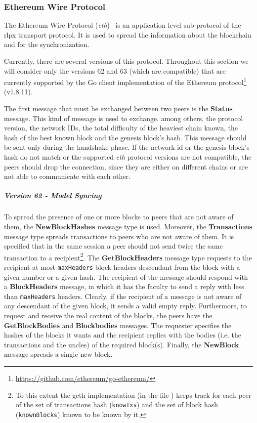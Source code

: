 \subsubsection{Ethereum Wire Protocol}
\label{sec:ethereum-wire-protocol}

The Ethereum Wire Protocol (\emph{eth})~\cite{bib:ethereumwireprotocol}  is an
application level sub-protocol of the rlpx transport protocol. It is used to 
spread the information about the blockchain and for the synchronization.

Currently, there are several versions of this protocol. Throughout 
this  section we will consider only the versions $62$ and $63$ (which are 
compatible) that are currently supported by the Go client implementation of the 
Ethereum protocol\footnote{\url{https://github.com/ethereum/go-ethereum/}}
(v1.8.11).

The first message that must be exchanged between two peers is the
\textbf{Status} message. This kind of message is used to exchange, among others,
the protocol version, the network IDs, the total difficulty of the heaviest
chain known, the hash of the best known block and the genesis block's hash. This
message should be sent only during the handshake phase. If the network id or the
genesis block's hash do not match or the supported \emph{eth} protocol versions
are not compatible, the peers should drop the connection, since they are either
on different chains or are not able to communicate with each other.

\subparagraph{Version 62 - Model Syncing}
To spread the presence of one or more blocks to peers that are not aware of
them, the \textbf{NewBlockHashes} message type is used. Moreover, the
\textbf{Transactions} message type spreads transactions to peers who are not
aware of them. It is specified that in the same session a peer should not send
twice the same transaction to a recipient\footnote{To this extent the geth
implementation (in the file ) keeps track for each peer of the
set of transactions hash (\texttt{knowTxs}) and the set of block hash
(\texttt{knownBlocks}) known to be known by it.}. The \textbf{GetBlockHeaders}
message type requests to the recipient at most \texttt{maxHeaders} block headers
descendant from the block with a given number or a given hash. The recipient of
the message should respond with a \textbf{BlockHeaders} message, in which it has
the faculty to send a reply with less than \texttt{maxHeaders} headers. Clearly,
if the recipient of a message is not aware of any descendant of the given block,
it sends a valid empty reply. Furthermore, to request and receive the real
content of the blocks, the peers have the \textbf{GetBlockBodies} and
\textbf{Blockbodies} messages. The requester specifies the hashes of the blocks
it wants and the recipient replies with the bodies (i.e. the transactions and
the uncles) of the required block(s). Finally, the \textbf{NewBlock} message
spreads a single new block.

